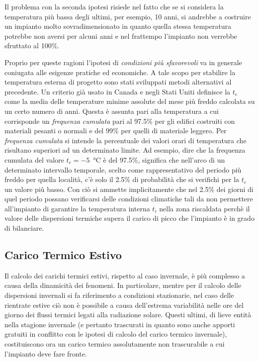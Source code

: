 Il problema con la seconda ipotesi risiede nel fatto che se si considera la temperatura più bassa degli ultimi, per esempio, 10 anni, si andrebbe a costruire un impianto molto sovradimensionato in quanto quella stessa temperatura potrebbe non aversi per alcuni anni e nel frattempo l'impianto non verrebbe sfruttato al 100\%. 

Proprio per queste ragioni l'ipotesi di \emph{condizioni più sfavorevoli} va in generale coniugata alle esigenze pratiche ed economiche. A tale scopo per stabilire la temperatura esterna di progetto sono stati sviluppati metodi alternativi al precedente. Un criterio già usato in Canada e negli Stati Uniti definisce la $t_e$ come la media delle temperature minime assolute del mese più freddo calcolata su un certo numero di anni. Questa è assunta pari alla temperatura a cui corrisponde un \emph{frequenza cumulata} pari al 97.5\% per gli edifici costruiti con materiali pesanti o normali e del 99\% per quelli di materiale leggero. Per \emph{frequenza cumulata} si intende la percentuale dei valori orari di temperatura che risultano superiori ad un determinato limite. Ad esempio, dire che la frequenza cumulata del valore $t_e=-5$\ \si{\degreeCelsius} è del 97.5\%, significa che nell'arco di un determinato intervallo temporale, scelto come rappresentativo del periodo più freddo per quella località, c'è solo il 2.5\% di probabilità che si verifichi per la $t_e$ un valore più basso. Con ciò si ammette implicitamente che nel 2.5\% dei giorni di quel periodo possano verificarsi delle condizioni climatiche tali da non permettere all'impianto di garantire la temperatura interna $t_i$ nella zona riscaldata perchè il valore delle dispersioni termiche supera il carico di picco che l'impianto è in grado di bilanciare.

\subsection{Carico Termico Estivo}
Il calcolo dei carichi termici estivi, rispetto al caso invernale, è più complesso a causa della dinamicità dei fenomeni. In particolare, mentre per il calcolo delle dispersioni invernali si fa riferimento a condizioni stazionarie, nel caso delle rientrate estive ciò non è possibile a causa dell'estrema variabilità nelle ore del giorno dei flussi termici legati alla radiazione solare. Questi ultimi, di lieve entità nella stagione invernale (e pertanto trascurati in quanto sono anche apporti gratuiti in conflitto con le ipotesi di calcolo del carico termico invernale), costituiscono ora un carico termico assolutamente non trascurabile a cui l'impianto deve fare fronte.

